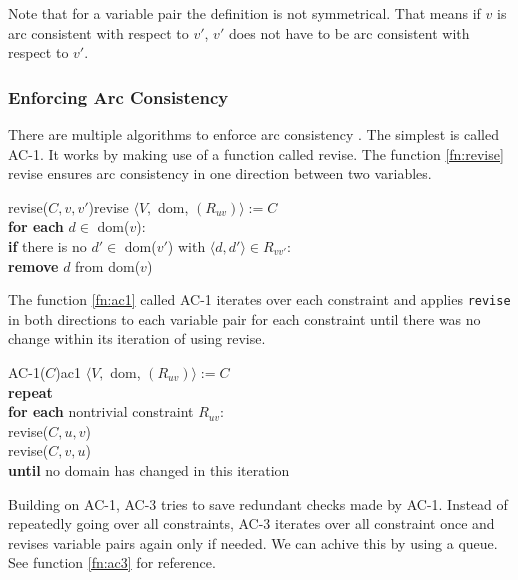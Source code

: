 Note that for a variable pair the definition is not symmetrical. That means if $v$ is arc consistent with respect to $v'$, $v'$ does not have to be arc consistent with respect to $v'$.

\subsubsection{Enforcing Arc Consistency}

There are multiple algorithms to enforce arc consistency \cite{arc_studied:1977} \cite{arc_again:1994}. The simplest is called AC-1. It works by making use of a function called revise. The function \ref{fn:revise} revise ensures arc consistency in one direction between two variables. \\

\begin{function}{revise($C,v,v'$)}{revise}
	$\langle V,$ dom, $(R_{uv})\rangle := C$ \\
	\textbf{for each} $d \in$ dom($v$): \\
	\null \qquad \textbf{if} there is no $d' \in$ dom($v'$) with $\langle d, d' \rangle \in R_{vv'}$: \\
	\null \qquad \qquad \textbf{remove} $d$ from dom($v$)
\end{function}

The function \ref{fn:ac1} called AC-1 iterates over each constraint and applies \verb|revise| in both directions to each variable pair for each constraint until there was no change within its iteration of using revise. \\

\begin{function}{AC-1($C$)}{ac1}
	$\langle V,$ dom, $(R_{uv})\rangle := C$ \\
	\textbf{repeat} \\
	\null \qquad \textbf{for each} nontrivial constraint $R_{uv}$: \\
	\null \qquad \qquad revise($C, u, v$) \\
	\null \qquad \qquad revise($C, v, u$) \\
	\textbf{until} no domain has changed in this iteration
\end{function}

Building on AC-1, AC-3 tries to save redundant checks made by AC-1. Instead of repeatedly going over all constraints, AC-3 iterates over all constraint once and revises variable pairs again only if needed. We can achive this by using a queue. See function \ref{fn:ac3} for reference. \\

